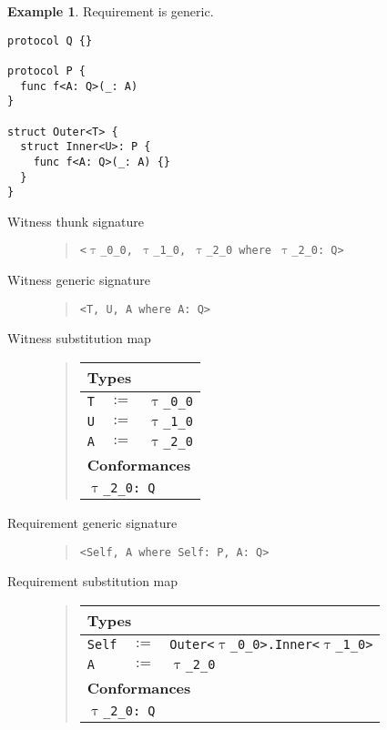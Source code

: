 \documentclass[a4paper,headsepline,bibliography=totoc,toc=flat,fleqn,twoside=semi]{scrbook}
\theoremstyle{definition}
\theoremstyle{definition}
\newtheorem{example}{Example}[chapter]
\theoremstyle{definition}
\newcommand{\ttgp}[2]{\texttt{$\uptau$\_#1\_#2}}
\newcommand{\SubMapC}[2]{\begin{tabular}{|lll|}
\hline
\multicolumn{3}{|l|}{\textbf{Types}}\\
\hline
#1\\
\hline
\hline
\multicolumn{3}{|l|}{\textbf{Conformances}}\\
\hline
#2\\
\hline
\end{tabular}}
\newcommand{\SubType}[2]{\texttt{#1}&$:=$&\texttt{#2}}
\newcommand{\SubConf}[1]{\multicolumn{3}{|l|}{\texttt{#1}}}
\begin{document}
\begin{example} Requirement is generic.
\begin{Verbatim}
protocol Q {}

protocol P {
  func f<A: Q>(_: A)
}

struct Outer<T> {
  struct Inner<U>: P {
    func f<A: Q>(_: A) {}
  }
}
\end{Verbatim}
\begin{description}
\item[Witness thunk signature]  \vphantom{a}
\begin{quote}
\texttt{<\ttgp{0}{0}, \ttgp{1}{0}, \ttgp{2}{0} where \ttgp{2}{0}:\ Q>}
\end{quote}
\item[Witness generic signature]  \vphantom{a}
\begin{quote}
\texttt{<T, U, A where A:\ Q>}
\end{quote}
\item[Witness substitution map] \vphantom{a}
\begin{quote}
\SubMapC{
\SubType{T}{\ttgp{0}{0}}\\
\SubType{U}{\ttgp{1}{0}}\\
\SubType{A}{\ttgp{2}{0}}
}{
\SubConf{\ttgp{2}{0}:\ Q}
}
\end{quote}

\item[Requirement generic signature]  \vphantom{a}
\begin{quote}
\texttt{<Self, A where Self:\ P, A:\ Q>}
\end{quote}
\item[Requirement substitution map] \phantom{a}
\begin{quote}
\SubMapC{
\SubType{Self}{Outer<\ttgp{0}{0}>.Inner<\ttgp{1}{0}>}\\
\SubType{A}{\ttgp{2}{0}}
}{
\SubConf{\ttgp{2}{0}:\ Q}
}
\end{quote}
\end{description}
\end{example}

\vfill
\eject
\end{document}

